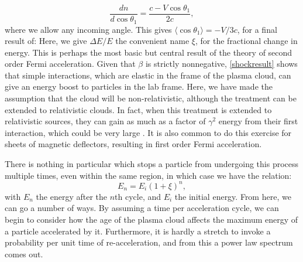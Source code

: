 $$\frac{dn}{d\cos\theta_1}=\frac{c-V\cos\theta_1}{2c},$$
where we allow any incoming angle. This gives $\langle\cos\theta_1\rangle=-V/3c$, for a final result of:
Here, we give $\Delta E/E$ the convenient name $\xi$, for the fractional change in energy. This is perhaps the most basic but central result of the theory of second order Fermi acceleration. Given that $\beta$ is strictly nonnegative, \autoref{shockresult} shows that simple interactions, which are elastic in the frame of the plasma cloud, can give an energy boost to particles in the lab frame. Here, we have made the assumption that the cloud will be non-relativistic, although the treatment can be extended to relativistic clouds. In fact, when this treatment is extended to relativistic sources, they can gain as much as a factor of $\gamma^2$ energy from their first interaction, which could be very large \cite{shocks}. It is also common to do this exercise for sheets of magnetic deflectors, resulting in first order Fermi acceleration. 

There is nothing in particular which stops a particle from undergoing this process multiple times, even within the same region, in which case we have the relation:
$$E_n=E_i(1+\xi)^n,$$
with $E_n$ the energy after the $n$th cycle, and $E_i$ the initial energy. From here, we can go a number of ways. By assuming a time per acceleration cycle, we can begin to consider how the age of the plasma cloud affects the maximum energy of a particle accelerated by it. Furthermore, it is hardly a stretch to invoke a probability per unit time of re-acceleration, and from this a power law spectrum comes out.  

